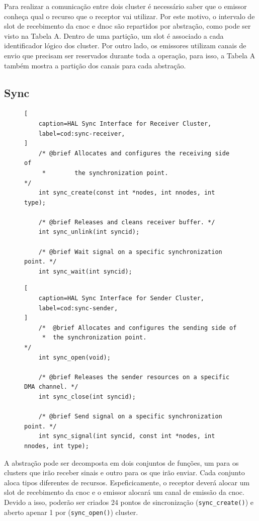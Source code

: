	Para realizar a comunicação entre dois cluster é necessário saber
	que o emissor conheça qual o recurso que o receptor vai utilizar.
	Por este motivo, o intervalo de slot de recebimento da cnoc e dnoc
	são repartidos por abstração, como pode ser visto na Tabela A.
	Dentro de uma partição, um slot é associado a cada identificador lógico dos cluster.
	Por outro lado, os emissores utilizam canais de envio que precisam
	ser reservados durante toda a operação, para isso, a Tabela A também mostra
	a partição dos canais para cada abstração.

	\subsection{Sync}

\begin{figure}[t]
\begin{lstlisting}[
	caption=HAL Sync Interface for Receiver Cluster,
	label=cod:sync-receiver,
]
	/* @brief Allocates and configures the receiving side of
	 *        the synchronization point.                     */
	int sync_create(const int *nodes, int nnodes, int type);

	/* @brief Releases and cleans receiver buffer. */
	int sync_unlink(int syncid);

	/* @brief Wait signal on a specific synchronization point. */
	int sync_wait(int syncid);
\end{lstlisting}
\end{figure}

\begin{figure}[t]
\begin{lstlisting}[
	caption=HAL Sync Interface for Sender Cluster,
	label=cod:sync-sender,
]
	/*  @brief Allocates and configures the sending side of
	 *  the synchronization point.                          */
	int sync_open(void);

	/* @brief Releases the sender resources on a specific DMA channel. */
	int sync_close(int syncid);

	/* @brief Send signal on a specific synchronization point. */
	int sync_signal(int syncid, const int *nodes, int nnodes, int type);
\end{lstlisting}
\end{figure}

		A abstração \sync pode ser decomposta em dois conjuntos de funções, um para
		os clusters que irão receber sinais e outro para os que irão enviar.
		Cada conjunto aloca tipos diferentes de recursos.
		Espeficicamente, o receptor deverá alocar um slot de recebimento da cnoc
		e o emissor alocará um canal de emissão da cnoc.
		Devido a isso, poderão ser criados 24 pontos de sincronização (\texttt{sync\_create()})
		e aberto apenar 1 por (\texttt{sync\_open()}) cluster.

